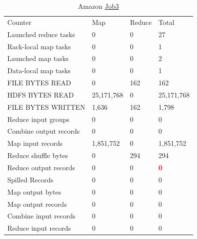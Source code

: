 \documentclass[paper=a4, fontsize=11pt]{scrartcl}	%
\numberwithin{equation}{section}															%
\numberwithin{figure}{section}																%
\numberwithin{table}{section}																%
\begin{document}
\begin{table}[!h]
	\centering
	\caption{Amazon \href{http://hadoop-compute0.di.univr.it:50030/jobdetails.jsp?jobid=job_201603141010_12298}{Job3}}
	\label{my-label}
	\begin{tabular}{llll}
		Counter&	Map&	Reduce&	Total\\
		Launched reduce tasks&	0&	0&	27\\
		Rack-local map tasks&	0&	0&	1\\
		Launched map tasks&	0&	0&	2\\
		Data-local map tasks&	0&	0&	1\\
		FILE BYTES READ&	0&	162&	162\\
		HDFS BYTES READ&	25,171,768&	0&	25,171,768\\
		FILE BYTES WRITTEN&	1,636&	162&	1,798\\
		Reduce input groups&	0&	0&	0\\
		Combine output records&	0&	0&	0\\
		Map input records&	1,851,752&	0&	1,851,752\\
		Reduce shuffle bytes&	0&	294&	294\\
		Reduce output records&	0&	0&	\textbf{\textcolor{red}{0}}\\
		Spilled Records&	0&	0&	0\\
		Map output bytes&	0&	0&	0\\
		Map output records&	0&	0&	0\\
		Combine input records&	0&	0&	0\\
		Reduce input records&	0&	0&	0\\
	\end{tabular}
\end{table}
\end{document}
